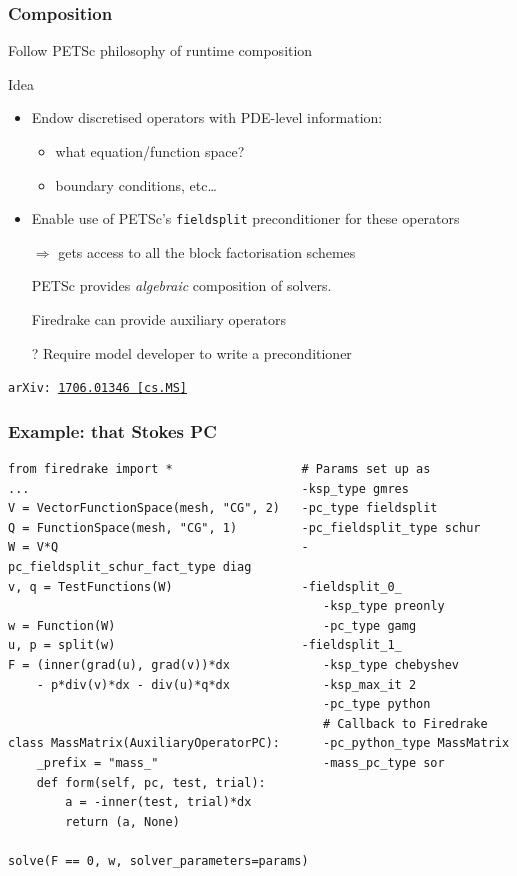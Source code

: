 \documentclass[presentation,aspectratio=43, 10pt]{beamer}
\newcommand{\cmark}{\ding{51}}
\newcommand{\xmark}{\ding{55}}
\newcommand{\arxivlink}[2]{{\texttt{arXiv:\,\href{https://arxiv.org/abs/#1}{#1\,[#2]}}}}
\begin{document}
\begin{frame}
  \frametitle{Composition}

  Follow PETSc philosophy of runtime composition
  \begin{block}{Idea}
    \begin{itemize}
    \item Endow discretised operators with PDE-level information:
      \begin{itemize}
      \item what equation/function space?
      \item boundary conditions, etc\ldots
      \end{itemize}
    \item Enable use of PETSc's \texttt{fieldsplit} preconditioner for
      these operators
    \item[$\Rightarrow$] gets access to all the block factorisation
      schemes
    \item[\cmark] PETSc provides \emph{algebraic} composition of solvers. \nocite{Brown:2012}
    \item[\cmark] Firedrake can provide auxiliary operators
    \item[\xmark?] Require model developer to write a preconditioner
    \end{itemize}
  \end{block}
  {\raggedleft \scriptsize
    \textcite{Kirby:2018} \arxivlink{1706.01346}{cs.MS}\par}
\end{frame}
\begin{frame}[fragile]
  \frametitle{Example: that Stokes PC}
\begin{verbatim}
from firedrake import *                  # Params set up as
...                                      -ksp_type gmres
V = VectorFunctionSpace(mesh, "CG", 2)   -pc_type fieldsplit
Q = FunctionSpace(mesh, "CG", 1)         -pc_fieldsplit_type schur
W = V*Q                                  -pc_fieldsplit_schur_fact_type diag
v, q = TestFunctions(W)                  -fieldsplit_0_
                                            -ksp_type preonly
w = Function(W)                             -pc_type gamg
u, p = split(w)                          -fieldsplit_1_
F = (inner(grad(u), grad(v))*dx             -ksp_type chebyshev
    - p*div(v)*dx - div(u)*q*dx             -ksp_max_it 2
                                            -pc_type python
                                            # Callback to Firedrake
class MassMatrix(AuxiliaryOperatorPC):      -pc_python_type MassMatrix
    _prefix = "mass_"                       -mass_pc_type sor
    def form(self, pc, test, trial):
        a = -inner(test, trial)*dx
        return (a, None)

solve(F == 0, w, solver_parameters=params)
\end{verbatim}
\end{frame}
\end{document}
